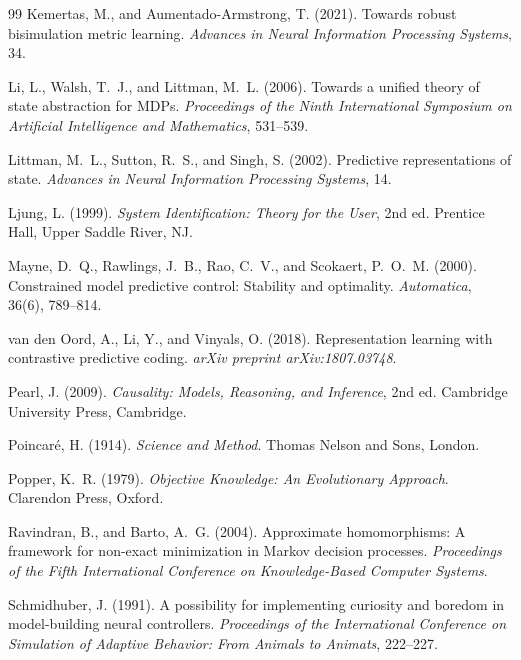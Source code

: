 \documentclass[11pt, a4paper]{article}
\theoremstyle{plain}
\theoremstyle{definition}
\theoremstyle{remark}
\begin{document}
\begin{thebibliography}{99}
Kemertas, M., and Aumentado-Armstrong, T. (2021).
Towards robust bisimulation metric learning.
\textit{Advances in Neural Information Processing Systems}, 34.

Li, L., Walsh, T.~J., and Littman, M.~L. (2006).
Towards a unified theory of state abstraction for MDPs.
\textit{Proceedings of the Ninth International Symposium on Artificial
Intelligence and Mathematics}, 531--539.

Littman, M.~L., Sutton, R.~S., and Singh, S. (2002).
Predictive representations of state.
\textit{Advances in Neural Information Processing Systems}, 14.

Ljung, L. (1999).
\textit{System Identification: Theory for the User}, 2nd ed.
Prentice Hall, Upper Saddle River, NJ.

Mayne, D.~Q., Rawlings, J.~B., Rao, C.~V., and Scokaert, P.~O.~M. (2000).
Constrained model predictive control: Stability and optimality.
\textit{Automatica}, 36(6), 789--814.

van den Oord, A., Li, Y., and Vinyals, O. (2018).
Representation learning with contrastive predictive coding.
\textit{arXiv preprint arXiv:1807.03748}.

Pearl, J. (2009).
\textit{Causality: Models, Reasoning, and Inference}, 2nd ed.
Cambridge University Press, Cambridge.

Poincar\'e, H. (1914).
\textit{Science and Method}.
Thomas Nelson and Sons, London.

Popper, K.~R. (1979).
\textit{Objective Knowledge: An Evolutionary Approach}.
Clarendon Press, Oxford.

Ravindran, B., and Barto, A.~G. (2004).
Approximate homomorphisms: A framework for non-exact minimization in Markov
decision processes.
\textit{Proceedings of the Fifth International Conference on Knowledge-Based
Computer Systems}.

Schmidhuber, J. (1991).
A possibility for implementing curiosity and boredom in model-building neural
controllers.
\textit{Proceedings of the International Conference on Simulation of Adaptive
Behavior: From Animals to Animats}, 222--227.


\end{thebibliography}
\end{document}
